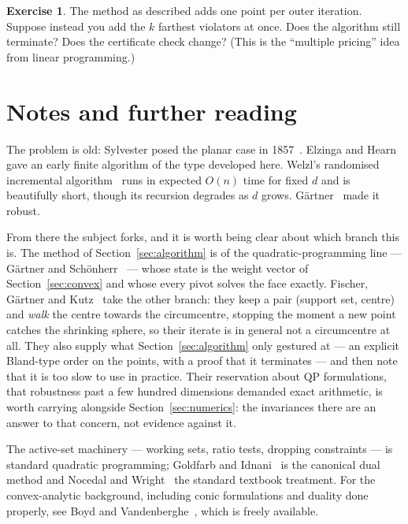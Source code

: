 \documentclass[11pt,a4paper]{article}
\theoremstyle{plain}
\theoremstyle{definition}
\newtheorem{exercise}{Exercise}
\theoremstyle{remark}
\begin{document}
\begin{exercise}
  The method as described adds one point per outer iteration. Suppose instead you
  add the $k$ farthest violators at once. Does the algorithm still terminate? Does
  the certificate check change? (This is the ``multiple pricing'' idea from linear
  programming.)
\end{exercise}

\section{Notes and further reading}
\label{sec:notes}

The problem is old: Sylvester posed the planar case in 1857~\cite{sylvester1857}.
Elzinga and Hearn~\cite{elzinga1972} gave an early finite algorithm of the type
developed here. Welzl's randomised incremental algorithm~\cite{welzl1991} runs in
expected $O(n)$ time for fixed $d$ and is beautifully short, though its recursion
degrades as $d$ grows. G\"artner~\cite{gaertner1999} made it robust.

From there the subject forks, and it is worth being clear about which branch this
is. The method of Section~\ref{sec:algorithm} is of the quadratic-programming
line --- G\"artner and Sch\"onherr~\cite{gaertner2000} --- whose state is the
weight vector of Section~\ref{sec:convex} and whose every pivot solves the face
exactly. Fischer, G\"artner and Kutz~\cite{fischer2003} take the other branch:
they keep a pair (support set, centre) and \emph{walk} the centre towards the
circumcentre, stopping the moment a new point catches the shrinking sphere, so
their iterate is in general not a circumcentre at all. They also supply what
Section~\ref{sec:algorithm} only gestured at --- an explicit Bland-type order on
the points, with a proof that it terminates --- and then note that it is too slow
to use in practice. Their reservation about QP formulations, that robustness past
a few hundred dimensions demanded exact arithmetic, is worth carrying alongside
Section~\ref{sec:numerics}: the invariances there are an answer to that concern,
not evidence against it.

The active-set machinery --- working sets, ratio tests, dropping constraints ---
is standard quadratic programming; Goldfarb and Idnani~\cite{goldfarb1983} is the
canonical dual method and Nocedal and Wright~\cite{nocedal2006} the standard
textbook treatment. For the convex-analytic background, including conic
formulations and duality done properly, see Boyd and
Vandenberghe~\cite{boyd2004}, which is freely available.
\end{document}
